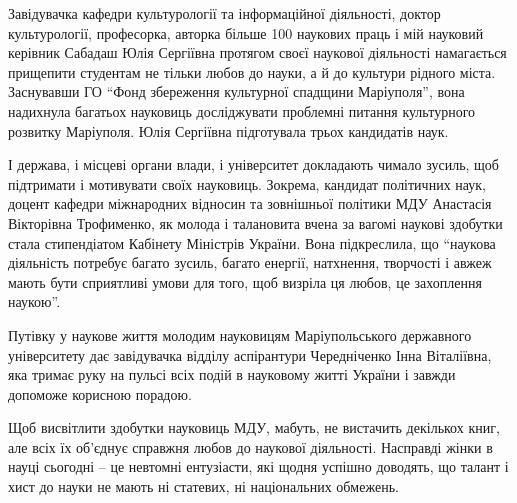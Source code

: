 
Завідувачка кафедри культурології та інформаційної діяльності, доктор
культурології, професорка, авторка більше 100 наукових праць і мій науковий
керівник Сабадаш Юлія Сергіївна протягом своєї наукової діяльності намагається
прищепити студентам не тільки любов до науки, а й до культури рідного міста.
Заснувавши ГО \enquote{Фонд збереження культурної спадщини Маріуполя}, вона надихнула
багатьох науковиць досліджувати проблемні питання культурного розвитку
Маріуполя. Юлія Сергіївна підготувала трьох кандидатів наук.


І держава, і місцеві органи влади, і університет докладають чимало зусиль, щоб
підтримати і мотивувати своїх науковиць. Зокрема, кандидат політичних наук,
доцент кафедри міжнародних відносин та зовнішньої політики МДУ Анастасія
Вікторівна Трофименко, як молода і талановита вчена за вагомі наукові здобутки
стала стипендіатом Кабінету Міністрів України. Вона підкреслила, що
\enquote{наукова діяльність потребує багато зусиль, багато енергії, натхнення,
творчості і авжеж мають бути сприятливі умови для того, щоб визріла ця любов,
це захоплення наукою}.

Путівку у наукове життя молодим науковицям Маріупольського державного
університету дає завідувачка відділу аспірантури Чередніченко Інна Віталіївна,
яка тримає руку на пульсі всіх подій в науковому житті України і завжди
допоможе корисною порадою.


Щоб висвітлити здобутки науковиць МДУ, мабуть, не вистачить декількох книг, але
всіх їх об'єднує справжня любов до наукової діяльності. Насправді жінки в науці
сьогодні – це невтомні ентузіасти, які щодня успішно доводять, що талант і хист
до науки не мають ні статевих, ні національних  обмежень.
